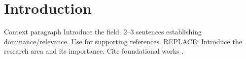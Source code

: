 \section{Introduction}
\label{sec:introduction}

 Context paragraph
 Introduce the field. 2–3 sentences establishing dominance/relevance.
 Use \citep{} for supporting references.
REPLACE: Introduce the research area and its importance.
Cite foundational works \citep{ExampleFoundation2020, ExampleSurvey2022}.
